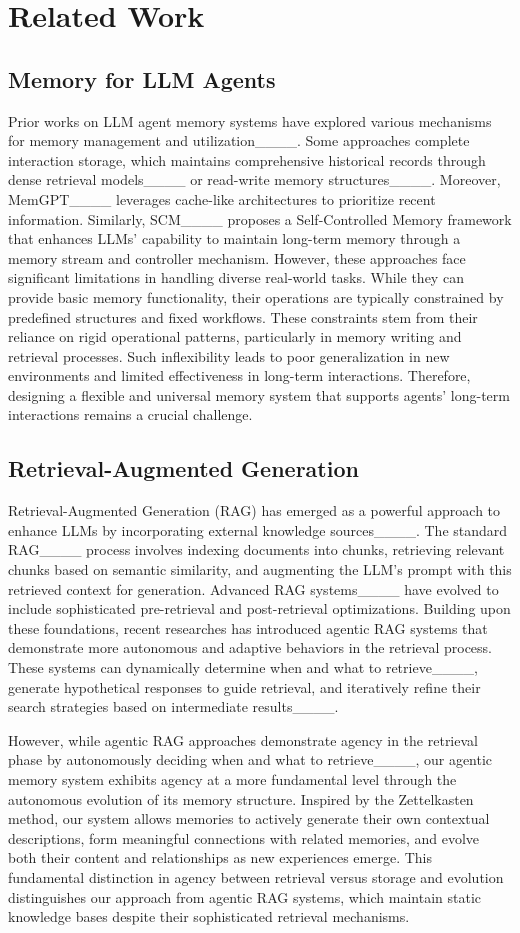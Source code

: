 \section{Related Work}
\subsection{Memory for LLM Agents}
Prior works on LLM agent memory systems have explored various mechanisms for memory management and utilization____. Some approaches complete interaction storage, which maintains comprehensive historical records through dense retrieval models____ or read-write memory structures____. Moreover, MemGPT____ leverages cache-like architectures to prioritize recent information. Similarly, SCM____ proposes a Self-Controlled Memory framework that enhances LLMs' capability to maintain long-term memory through a memory stream and controller mechanism.
However, these approaches face significant limitations in handling diverse real-world tasks. While they can provide basic memory functionality, their operations are typically constrained by predefined structures and fixed workflows. These constraints stem from their reliance on rigid operational patterns, particularly in memory writing and retrieval processes. Such inflexibility leads to poor generalization in new environments and limited effectiveness in long-term interactions. Therefore, designing a flexible and universal memory system that supports agents' long-term interactions remains a crucial challenge.


\subsection{Retrieval-Augmented Generation}
Retrieval-Augmented Generation (RAG) has emerged as a powerful approach to enhance LLMs by incorporating external knowledge sources____. The standard RAG____ process involves indexing documents into chunks, retrieving relevant chunks based on semantic similarity, and augmenting the LLM's prompt with this retrieved context for generation. Advanced RAG systems____ have evolved to include sophisticated pre-retrieval and post-retrieval optimizations.
Building upon these foundations, recent researches has introduced agentic RAG systems that demonstrate more autonomous and adaptive behaviors in the retrieval process. These systems can dynamically determine when and what to retrieve____, generate hypothetical responses to guide retrieval, and iteratively refine their search strategies based on intermediate results____. 

However, while agentic RAG approaches demonstrate agency in the retrieval phase by autonomously deciding when and what to retrieve____, our agentic memory system exhibits agency at a more fundamental level through the autonomous evolution of its memory structure. Inspired by the Zettelkasten method, our system allows memories to actively generate their own contextual descriptions, form meaningful connections with related memories, and evolve both their content and relationships as new experiences emerge. This fundamental distinction in agency between retrieval versus storage and evolution distinguishes our approach from agentic RAG systems, which maintain static knowledge bases despite their sophisticated retrieval mechanisms.